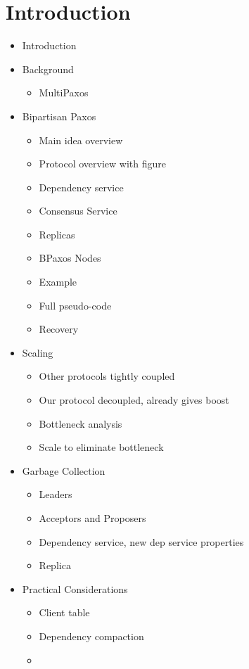 \section{Introduction}
\begin{itemize}
  \item Introduction

  \item Background
    \begin{itemize}
      \item MultiPaxos
    \end{itemize}

  \item Bipartisan Paxos
    \begin{itemize}
      \item Main idea overview
      \item Protocol overview with figure
      \item Dependency service
      \item Consensus Service
      \item Replicas
      \item BPaxos Nodes
      \item Example
      \item Full pseudo-code
      \item Recovery
    \end{itemize}

  \item Scaling
    \begin{itemize}
      \item Other protocols tightly coupled
      \item Our protocol decoupled, already gives boost
      \item Bottleneck analysis
      \item Scale to eliminate bottleneck
    \end{itemize}

  \item Garbage Collection
    \begin{itemize}
      \item Leaders
      \item Acceptors and Proposers
      \item Dependency service, new dep service properties
      \item Replica
    \end{itemize}

  \item Practical Considerations
    \begin{itemize}
      \item Client table
      \item Dependency compaction
      \item
    \end{itemize}


\end{itemize}
